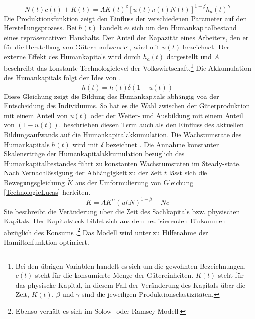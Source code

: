 \begin{equation}
N(t)c(t)+\dot{K}(t)=AK(t)^\beta[u(t)h(t)N(t)]^{1-\beta}h_a(t)^\gamma \label{TechnologieLucas}
\end{equation} 
Die Produktionsfunktion zeigt den Einfluss der verschiedenen Parameter auf den Herstellungsprozess. Bei $h(t)$ handelt es sich um den Humankapitalbestand eines repr{\"a}sentativen Haushalts. Der Anteil der Kapazit{\"a}t eines Arbeiters, den er f{\"u}r die Herstellung von G{\"u}tern aufwendet, wird mit $u(t)$ bezeichnet. Der externe Effekt des Humankapitals wird durch $h_a(t)$ dargestellt und $A$ beschreibt das konstante Technologielevel der Volkswirtschaft.\footnote{Bei den übrigen Variablen handelt es sich um die gewohnten Bezeichnungen. $c(t)$ steht für die konsumierte Menge der Gütereinheiten. $K(t)$ steht für das physische Kapital, in diesem Fall der Veränderung des Kapitals über die Zeit, $\dot{K}(t)$. $\beta$ und $\gamma$ sind die jeweiligen Produktionselastizitäten.} \newline Die Akkumulation des Humankapitals folgt der Idee von \citet{Uzawa.1965}.
\begin{equation} 
\dot{h}(t)=h(t)\delta(1-u(t)) 
\end{equation} 
Diese Gleichung zeigt die Bildung des Humankapitals abhängig von der Entscheidung des Individuums. So hat es die Wahl zwischen der Güterproduktion mit einem Anteil von $u(t)$ oder der Weiter- und Ausbildung mit einem Anteil von $(1-u(t))$. \citet[Kapitel 13]{Aghion.2015} beschrieben diesen Term auch als den Einfluss des aktuellen Bildungsaufwands auf die Humankapitalakkumulation. Die Wachstumsrate des Humankapitals $h(t)$ wird mit $\delta$ bezeichnet \citep[S.~17--19]{Lucas.1988}.
Die Annahme konstanter Skalenertr{\"a}ge der Humankapitalakkumulation bez{\"u}glich des Humankapitalbestandes f{\"u}hrt zu konstanten Wachstumsraten im Steady-state.\\
Nach Vernachlässigung der Abhängigkeit zu der Zeit $t$ lässt sich die Bewegungsgleichung $\dot{K}$ aus der Umformulierung von Gleichung \eqref{TechnologieLucas} herleiten.
\begin{equation}
\dot{K}=AK^\alpha(uhN)^{1-\beta}-Nc
\end{equation}
Sie beschreibt die Ver{\"a}nderung {\"u}ber die Zeit des Sachkapitals bzw. physischen Kapitals. Der Kapitalstock bildet sich aus dem realisierenden Einkommen abz{\"u}glich des Konsums \citep{Aghion.2015}.\footnote{Ebenso verhält es sich im Solow- oder Ramsey-Modell.}
Das Modell wird unter zu Hilfenahme der Hamiltonfunktion optimiert. 
